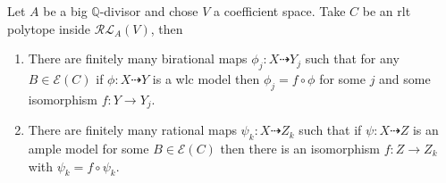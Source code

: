 	\begin{theorem}\label{weak finiteness}
		Let $A$ be a big $\mathbb{Q}$-divisor and chose $V$ a coefficient space. Take $C$ be an rlt polytope inside $\mathcal{RL}_{A}(V)$, then
		
		\begin{enumerate}
			\item There are finitely many birational maps $\phi_{j}: X \dashrightarrow Y_{j}$ such that for any $B \in \mathcal{E}(C)$ if $\phi: X \dashrightarrow Y$ is a wlc model then $\phi_{j}=f \circ \phi$ for some $j$ and some isomorphism $f: Y \to Y_{j}$. \\
			\item There are finitely many rational maps $\psi_{k}: X \dashrightarrow Z_{k}$ such that if $\psi:X \dashrightarrow Z$ is an ample model for some $B \in \mathcal{E}(C)$ then there is an isomorphism $f:Z \to Z_{k}$ with $\psi_{k}=f \circ \psi_{k}$.
		\end{enumerate}
	\end{theorem}
	
